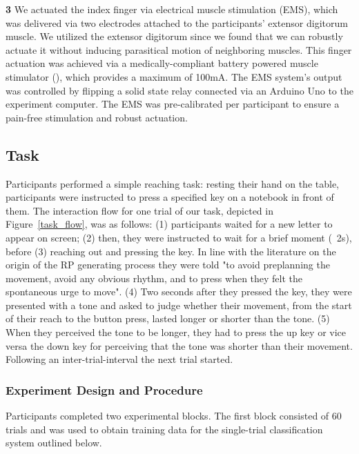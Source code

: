 \indent\textbf{3} We actuated the index finger via electrical muscle stimulation (EMS), which was delivered via two electrodes attached to the participants' extensor digitorum muscle. We utilized the extensor digitorum since we found that we can robustly actuate it without inducing parasitical motion of neighboring muscles. This finger actuation was achieved via a medically-compliant battery powered muscle stimulator (), which provides a maximum of 100mA. The EMS system's output was controlled by flipping a solid state relay connected via an Arduino Uno to the experiment computer. The EMS was pre-calibrated per participant to ensure a pain-free stimulation and robust actuation.

\subsection{Task}
Participants performed a simple reaching task: resting their hand on the table, participants were instructed to press a specified key on a notebook in front of them. The interaction flow for one trial of our task, depicted in Figure~\ref{task_flow}, was as follows: (1) participants waited for a new letter to appear on screen; (2) then, they were instructed to wait for a brief moment (~2s), before (3) reaching out and pressing the key. In line with the literature on the origin of the RP generating process they were told "to avoid preplanning the movement, avoid any obvious rhythm, and to press when they felt the spontaneous urge to move". (4) Two  seconds after they pressed the key, they were presented with a tone and asked to judge whether their movement, from the start of their reach to the button press, lasted longer or shorter than the tone. (5) When they perceived the tone to be longer, they had to press the up key or vice versa the down key for perceiving that the tone was shorter than their movement. Following an inter-trial-interval the next trial started.

\subsubsection{Experiment Design and Procedure}
Participants completed two experimental blocks. The first block consisted of 60 trials and was used to obtain training data for the single-trial classification system outlined below. 

